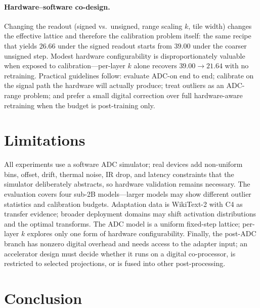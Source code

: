 \documentclass[letterpaper]{article} %
\theoremstyle{plain}
\begin{document}
\paragraph{Hardware--software co-design.}
Changing the readout (signed vs.\ unsigned, range scaling $k$, tile width) changes the effective lattice and therefore the calibration problem itself: the same recipe that yields $26.66$ under the signed readout starts from $39.00$ under the coarser unsigned step. Modest hardware configurability is disproportionately valuable when exposed to calibration---per-layer $k$ alone recovers $39.00 \to 21.64$ with no retraining. Practical guidelines follow: evaluate ADC-on end to end; calibrate on the signal path the hardware will actually produce; treat outliers as an ADC-range problem; and prefer a small digital correction over full hardware-aware retraining when the budget is post-training only.

\section{Limitations}

All experiments use a software ADC simulator; real devices add non-uniform bins, offset, drift, thermal noise, IR drop, and latency constraints that the simulator deliberately abstracts, so hardware validation remains necessary. The evaluation covers four sub-2B models---larger models may show different outlier statistics and calibration budgets. Adaptation data is WikiText-2 with C4 as transfer evidence; broader deployment domains may shift activation distributions and the optimal transforms. The ADC model is a uniform fixed-step lattice; per-layer $k$ explores only one form of hardware configurability. Finally, the post-ADC branch has nonzero digital overhead and needs access to the adapter input; an accelerator design must decide whether it runs on a digital co-processor, is restricted to selected projections, or is fused into other post-processing.

\section{Conclusion}
\end{document}
